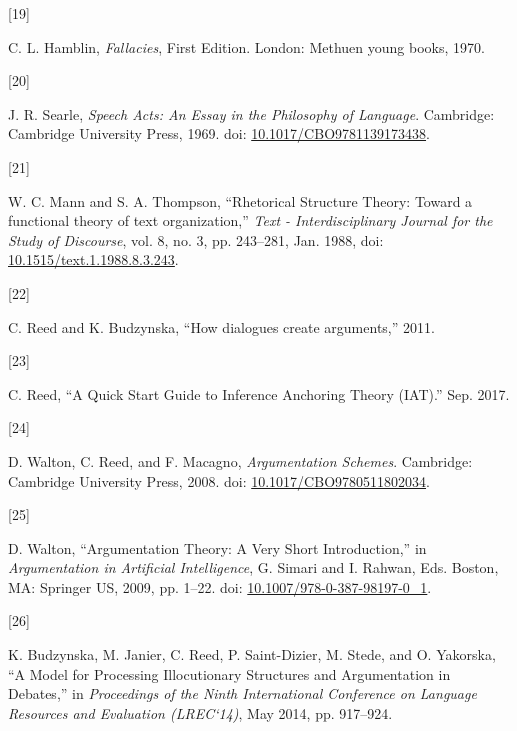 \documentclass[twocolumn]{article}
\newlength{\cslhangindent}
\newlength{\csllabelwidth}
\newenvironment{CSLReferences}[2] %
 {\begin{list}{}{%
  \setlength{\itemindent}{0pt}
  \setlength{\leftmargin}{0pt}
  \setlength{\parsep}{0pt}
  \ifodd #1
   \setlength{\leftmargin}{\cslhangindent}
   \setlength{\itemindent}{-1\cslhangindent}
  \fi
  \setlength{\itemsep}{#2\baselineskip}}}
 {\end{list}}
\newcommand{\CSLLeftMargin}[1]{\parbox[t]{\csllabelwidth}{\strut#1\strut}}
\newcommand{\CSLRightInline}[1]{\parbox[t]{\linewidth - \csllabelwidth}{\strut#1\strut}}
\begin{document}
\begin{CSLReferences}{0}{0}
\CSLLeftMargin{{[}19{]} }%
\CSLRightInline{C. L. Hamblin, \emph{Fallacies}, First Edition. London:
Methuen young books, 1970.}

\CSLLeftMargin{{[}20{]} }%
\CSLRightInline{J. R. Searle, \emph{Speech {Acts}: {An Essay} in the
{Philosophy} of {Language}}. Cambridge: Cambridge University Press,
1969. doi:
\href{https://doi.org/10.1017/CBO9781139173438}{10.1017/CBO9781139173438}.}

\CSLLeftMargin{{[}21{]} }%
\CSLRightInline{W. C. Mann and S. A. Thompson, {``Rhetorical {Structure
Theory}: {Toward} a functional theory of text organization,''}
\emph{Text - Interdisciplinary Journal for the Study of Discourse}, vol.
8, no. 3, pp. 243--281, Jan. 1988, doi:
\href{https://doi.org/10.1515/text.1.1988.8.3.243}{10.1515/text.1.1988.8.3.243}.}

\CSLLeftMargin{{[}22{]} }%
\CSLRightInline{C. Reed and K. Budzynska, {``How dialogues create
arguments,''} 2011.}

\CSLLeftMargin{{[}23{]} }%
\CSLRightInline{C. Reed, {``A {Quick Start Guide} to {Inference
Anchoring Theory} ({IAT}).''} Sep. 2017.}

\CSLLeftMargin{{[}24{]} }%
\CSLRightInline{D. Walton, C. Reed, and F. Macagno, \emph{Argumentation
{Schemes}}. Cambridge: Cambridge University Press, 2008. doi:
\href{https://doi.org/10.1017/CBO9780511802034}{10.1017/CBO9780511802034}.}

\CSLLeftMargin{{[}25{]} }%
\CSLRightInline{D. Walton, {``Argumentation {Theory}: {A Very Short
Introduction},''} in \emph{Argumentation in {Artificial Intelligence}},
G. Simari and I. Rahwan, Eds. Boston, MA: Springer US, 2009, pp. 1--22.
doi:
\href{https://doi.org/10.1007/978-0-387-98197-0_1}{10.1007/978-0-387-98197-0\_1}.}

\CSLLeftMargin{{[}26{]} }%
\CSLRightInline{K. Budzynska, M. Janier, C. Reed, P. Saint-Dizier, M.
Stede, and O. Yakorska, {``A {Model} for {Processing Illocutionary
Structures} and {Argumentation} in {Debates},''} in \emph{Proceedings of
the {Ninth International Conference} on {Language Resources} and
{Evaluation} ({LREC}`14)}, May 2014, pp. 917--924.}


\end{CSLReferences}
\end{document}
